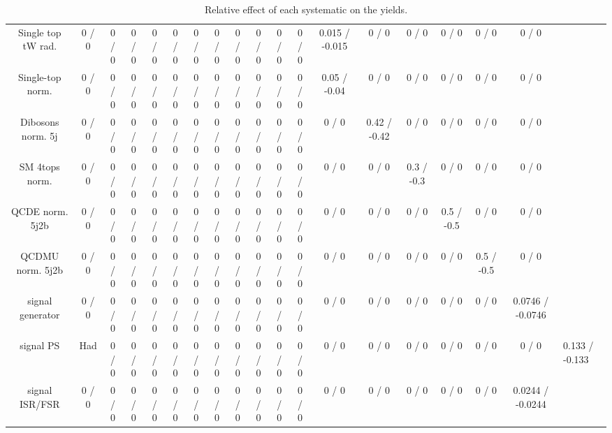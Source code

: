 \documentclass[10pt]{article}
\begin{document}
\begin{table}[htbp]
\begin{center}
\begin{tabular}{|c|c|c|c|c|c|c|c|c|c|c|c|c|c|c|c|c|c|}
  Single top tW rad. & 0 / 0 & 0 / 0 & 0 / 0 & 0 / 0 & 0 / 0 & 0 / 0 & 0 / 0 & 0 / 0 & 0 / 0 & 0 / 0 & 0 / 0 & 0.015 / -0.015 & 0 / 0 & 0 / 0 & 0 / 0 & 0 / 0 & 0 / 0 \\ 
  Single-top norm. & 0 / 0 & 0 / 0 & 0 / 0 & 0 / 0 & 0 / 0 & 0 / 0 & 0 / 0 & 0 / 0 & 0 / 0 & 0 / 0 & 0 / 0 & 0.05 / -0.04 & 0 / 0 & 0 / 0 & 0 / 0 & 0 / 0 & 0 / 0 \\ 
  Dibosons norm. 5j & 0 / 0 & 0 / 0 & 0 / 0 & 0 / 0 & 0 / 0 & 0 / 0 & 0 / 0 & 0 / 0 & 0 / 0 & 0 / 0 & 0 / 0 & 0 / 0 & 0.42 / -0.42 & 0 / 0 & 0 / 0 & 0 / 0 & 0 / 0 \\ 
  SM 4tops norm. & 0 / 0 & 0 / 0 & 0 / 0 & 0 / 0 & 0 / 0 & 0 / 0 & 0 / 0 & 0 / 0 & 0 / 0 & 0 / 0 & 0 / 0 & 0 / 0 & 0 / 0 & 0.3 / -0.3 & 0 / 0 & 0 / 0 & 0 / 0 \\ 
  QCDE norm. 5j2b & 0 / 0 & 0 / 0 & 0 / 0 & 0 / 0 & 0 / 0 & 0 / 0 & 0 / 0 & 0 / 0 & 0 / 0 & 0 / 0 & 0 / 0 & 0 / 0 & 0 / 0 & 0 / 0 & 0.5 / -0.5 & 0 / 0 & 0 / 0 \\ 
  QCDMU norm. 5j2b & 0 / 0 & 0 / 0 & 0 / 0 & 0 / 0 & 0 / 0 & 0 / 0 & 0 / 0 & 0 / 0 & 0 / 0 & 0 / 0 & 0 / 0 & 0 / 0 & 0 / 0 & 0 / 0 & 0 / 0 & 0.5 / -0.5 & 0 / 0 \\ 
  signal generator & 0 / 0 & 0 / 0 & 0 / 0 & 0 / 0 & 0 / 0 & 0 / 0 & 0 / 0 & 0 / 0 & 0 / 0 & 0 / 0 & 0 / 0 & 0 / 0 & 0 / 0 & 0 / 0 & 0 / 0 & 0 / 0 & 0.0746 / -0.0746 \\ 
  signal PS & Had & 0 / 0 & 0 / 0 & 0 / 0 & 0 / 0 & 0 / 0 & 0 / 0 & 0 / 0 & 0 / 0 & 0 / 0 & 0 / 0 & 0 / 0 & 0 / 0 & 0 / 0 & 0 / 0 & 0 / 0 & 0 / 0 & 0.133 / -0.133 \\ 
  signal ISR/FSR & 0 / 0 & 0 / 0 & 0 / 0 & 0 / 0 & 0 / 0 & 0 / 0 & 0 / 0 & 0 / 0 & 0 / 0 & 0 / 0 & 0 / 0 & 0 / 0 & 0 / 0 & 0 / 0 & 0 / 0 & 0 / 0 & 0.0244 / -0.0244 \\ 
\hline 
\end{tabular} 
\caption{Relative effect of each systematic on the yields.} 
\end{center} 
\end{table} 
\end{document}
